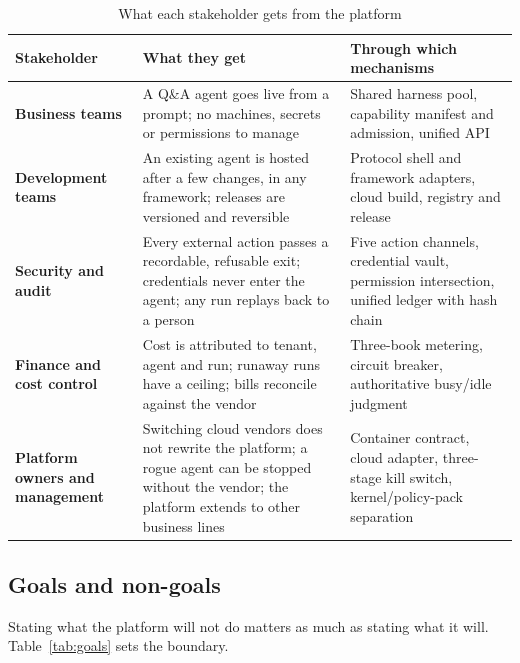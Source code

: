 \begin{table}[htbp]
\centering
\caption{What each stakeholder gets from the platform}
\label{tab:value}
\begin{tabularx}{\textwidth}{@{}>{\bfseries}L{2.9cm}YY@{}}
  \toprule
  \textbf{Stakeholder} & \textbf{What they get} & \textbf{Through which mechanisms}\\
  \midrule
  Business teams & A Q\&A agent goes live from a prompt; no machines, secrets or permissions to manage & Shared harness pool, capability manifest and admission, unified API\\
  Development teams & An existing agent is hosted after a few changes, in any framework; releases are versioned and reversible & Protocol shell and framework adapters, cloud build, registry and release\\
  Security and audit & Every external action passes a recordable, refusable exit; credentials never enter the agent; any run replays back to a person & Five action channels, credential vault, permission intersection, unified ledger with hash chain\\
  Finance and cost control & Cost is attributed to tenant, agent and run; runaway runs have a ceiling; bills reconcile against the vendor & Three-book metering, circuit breaker, authoritative busy/idle judgment\\
  Platform owners and management & Switching cloud vendors does not rewrite the platform; a rogue agent can be stopped without the vendor; the platform extends to other business lines & Container contract, cloud adapter, three-stage kill switch, kernel/policy-pack separation\\
  \bottomrule
\end{tabularx}
\end{table}

\subsection{Goals and non-goals}

Stating what the platform will not do matters as much as stating what it will. Table~\ref{tab:goals} sets the boundary.

